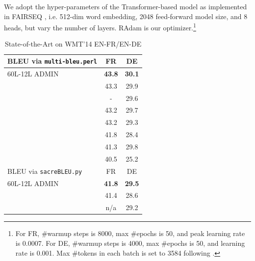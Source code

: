 We adopt the hyper-parameters of the Transformer-based model \cite{vaswani2017attention} as implemented in FAIRSEQ \cite{ott2019fairseq}, i.e. 512-dim word embedding, 2048 feed-forward model size, and 8 heads, but vary the number of layers. RAdam \cite{liu2019radam} is our optimizer.\footnote{For FR, \#warmup steps is 8000,  max \#epochs is 50, and peak learning rate is 0.0007. For DE, \#warmup steps is 4000,  max \#epochs is 50, and learning rate is 0.001. Max \#tokens in each batch is set to 3584 following \cite{ott2019fairseq}.} 

\begin{table}[ht]
    \centering
    \begin{tabular}{|l|c|c|}
    \hline
        BLEU via \texttt{multi-bleu.perl} & FR & DE \\\hline
        60L-12L ADMIN & {\bf 43.8}  & {\bf 30.1}\\
        \cite{wu2019depth}  & 43.3 & 29.9 \\
        \cite{wang2019preln} & - & 29.6\\
        \cite{wu19dycnn}  & 43.2 & 29.7 \\
        \cite{ott-etal-2018-scaling} & 43.2 & 29.3 \\
        \cite{vaswani2017attention} & 41.8 & 28.4 \\
        \cite{so19evolved}   & 41.3 & 29.8 \\    
        \cite{gehring2017}  & 40.5 & 25.2\\
        \hline\hline
        BLEU via \texttt{sacreBLEU.py} & FR & DE \\\hline
        60L-12L ADMIN & {\bf 41.8}  & {\bf 29.5} \\        
        \cite{ott-etal-2018-scaling} & 41.4 & 28.6 \\
        \cite{so19evolved}   & n/a & 29.2 \\    
        \hline
    \end{tabular}
    \caption{State-of-the-Art on WMT'14 EN-FR/EN-DE}
    \label{tab:sota}
\vspace{-4mm}    
\end{table}



